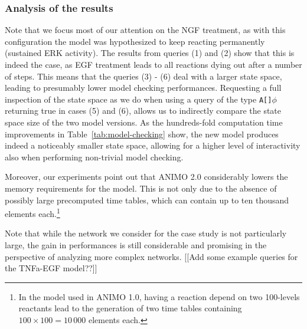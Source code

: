 \documentclass{bmcart}
\begin{document}
\subsubsection*{Analysis of the results}
Note that we focus most of our attention on the NGF treatment, as with this configuration the model
was hypothesized to keep reacting permanently (sustained ERK activity). The results from queries (1) and (2)
show that this is indeed the case, as EGF treatment leads to all reactions dying out after a number of steps.
This means that the queries (3) - (6) deal with a larger state space, leading to presumably lower model checking performances.
Requesting a full inspection of the state space
as we do when using a query of the type {\tt A[]$\phi$} returning true in cases (5) and (6), allows us to indirectly compare the state space size of the two
model versions. As the hundreds-fold computation time improvements in Table~\ref{tab:model-checking} show, the new model produces
indeed a noticeably smaller state space, allowing for a higher level of interactivity also when performing non-trivial model checking.

Moreover, our experiments point out that ANIMO 2.0 considerably lowers the memory
requirements for the model. This is not only due to the absence of possibly large precomputed time tables,
which can contain up to ten thousand elements each.\footnote{In the model used in ANIMO 1.0, having a reaction depend on two 100-levels reactants
lead to the generation of two time tables containing $100 \times 100 = 10\,{}000$ elements each.}

Note that while the network we consider for the case study is not particularly large, the gain in performances is still considerable
and promising in the perspective of analyzing more complex networks.
{\Large [[Add some example queries for the TNFa-EGF model??]]}
\end{document}
